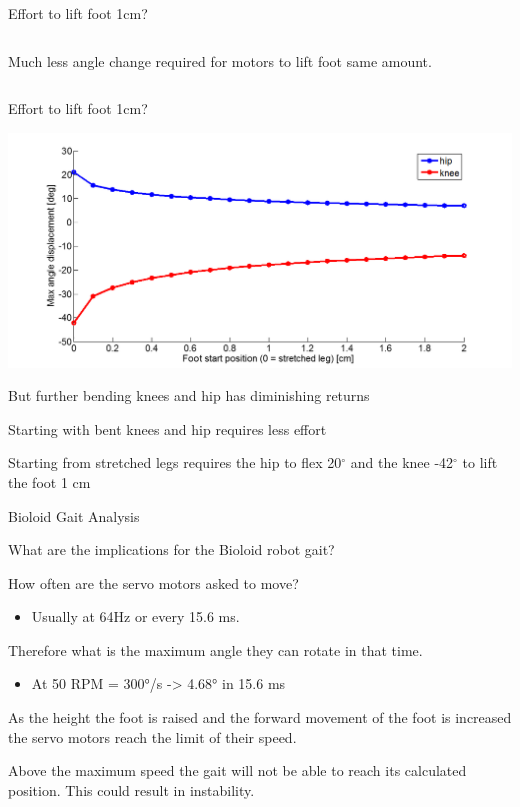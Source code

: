 \documentclass[compress]{beamer}
\begin{document}
\begin{frame}{Effort to lift foot 1cm?}
\begin{columns}
\begin{column}{0.5\linewidth}
        Much less angle change required for motors to lift foot same amount.
        \end{column}
    \end{columns}

\end{frame}

\begin{frame}{Effort to lift foot 1cm?}

    \begin{center}
        \includegraphics[width=0.8\linewidth]{graph3}
    \end{center}

    But further bending knees and hip has diminishing returns

    Starting with bent knees and hip requires less effort

    Starting from stretched legs requires the hip to flex 20$^\circ$ and the knee
    -42$^\circ$ to lift the foot 1 cm

\end{frame}

\begin{frame}{Bioloid Gait Analysis}

    What are the implications for the Bioloid robot gait?

    How often are the servo motors asked to move?

    \begin{itemize}

        \item Usually at 64Hz or every 15.6 ms.
    \end{itemize}

    Therefore what is the maximum angle they can rotate in that time.

    \begin{itemize}

        \item At 50 RPM = 300°/s -\textgreater{} 4.68° in 15.6 ms
    \end{itemize}

    As the height the foot is raised and the forward movement of the foot is
    increased the servo motors reach the limit of their speed.

    Above the maximum speed the gait will not be able to reach its
    calculated position. This could result in instability.

\end{frame}
\end{document}
